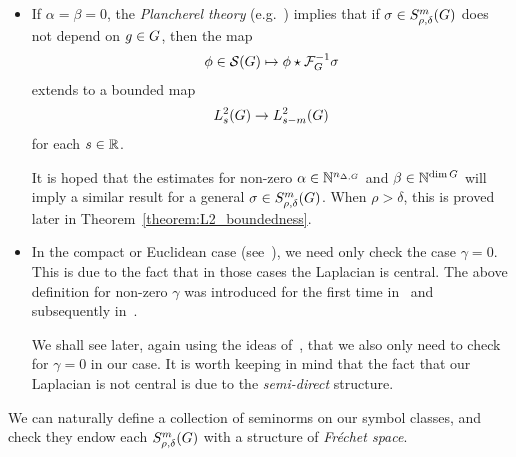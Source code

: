 \begin{itemize}
    \item If $\alpha = \beta = 0$,
        the \emph{Plancherel theory} (e.g.~\cite[Theorem 1.8.11]{FischerRuzhansky16}) implies that
        if $\sigma \in S^{m}_{\rho, \delta}(G)$ does not depend on $g \in G$,
        then the map
        \begin{align*}
            \phi \in {\mathcal{S} (G)} \mapsto \phi \star \mathcal{F}^{-1}_{G} \sigma
        \end{align*}
        extends to a bounded map
        \begin{align*}
            L^2_{s}(G) \to L^2_{s - m}(G)
        \end{align*}
        for each $s \in \mathbb{R}$.

        It is hoped that the estimates for non-zero $\alpha \in \mathbb{N}^{n_{\Delta, G}}$ and $\beta \in \mathbb{N}^{\dim G}$
        will imply a similar result for a general $\sigma \in S^{m}_{\rho, \delta}(G)$.
        When $\rho > \delta$,
        this is proved later in Theorem~\ref{theorem:L2_boundedness}.
    \item
        In the compact or Euclidean case (see~\cite{RuzhanskyTurunen10}),
        we need only check the case $\gamma = 0$.
        This is due to the fact that in those cases the Laplacian is central.
        The above definition for non-zero $\gamma$ was introduced for the first time in~\cite[Section 3.4]{FischerRuzhansky12} and subsequently in~\cite[Section 5.2]{FischerRuzhansky16}.

        We shall see later, again using the ideas of~\cite{FischerRuzhansky16},
        that we also only need to check for $\gamma = 0$ in our case.
        It is worth keeping in mind that the fact that our Laplacian is not central
        is due to the \emph{semi-direct} structure.
\end{itemize}

We can naturally define a collection of seminorms on our symbol classes,
and check they endow each $S^{m}_{\rho, \delta}(G)$ with a structure of \emph{Fr\'echet space}.

